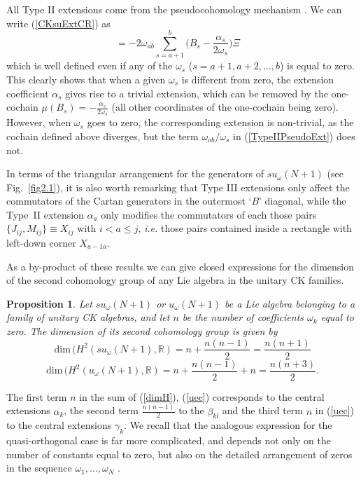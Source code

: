 \documentclass[12pt]{article}
\newtheorem{proposition}{Proposition}[section]}
\begin{document}
All Type II extensions come from the pseudocohomology mechanism
\cite{Ald.Azc:85b,Azc.Izq:95}. We can write (\ref{CKsuExtCR}) as
\begin{equation}
[{J}_{ab},{M}_{ab}]=-2{\omega}_{ab} \sum_{s=a+1}^b \big(  {B}_s -
\frac{{\alpha}_{s}}{2 {\omega}_s} \big) \Xi \quad
\label{TypeIIPseudoExt}
\end{equation}
which is well defined even if any of the ${\omega}_s$
($s=a+1, a+2, \dots, b$) is equal to zero.
This clearly shows that when a given
${\omega}_s$  is different from zero, the extension
coefficient
${\alpha}_{s}$ gives rise to a trivial extension, which can be
removed by the one-cochain
$\mu(B_s)=-\frac{{\alpha}_s}{2 {\omega}_s}$ (all other coordinates of the
one-cochain being zero). However, when ${\omega}_s$ goes to zero, the
corresponding extension is non-trivial, as the cochain  defined above
diverges, but the term ${\omega}_{ab}/{\omega}_s$
in (\ref{TypeIIPseudoExt}) does not.

In terms of the triangular arrangement for the generators of
${su}_{\omega}(N+1)$ (see Fig.~\ref{fig2.1}), it is also  worth remarking
that   Type III extensions only affect the commutators of the Cartan
generators in the outermost `$B$' diagonal, while the Type~II extension
${\alpha}_a$  only modifies the commutators of each those pairs
$\{{J}_{ij},{M}_{ij}\}\equiv{X}_{ij}$ with $i<a \leq j$, {\it i.e.} those pairs
contained inside a rectangle
with left-down corner ${X}_{a-1 a}$.

As a by-product of these results we can give closed expressions for
the dimension of the second cohomology group of any Lie algebra in
the unitary CK families.

\begin{proposition}
\label{prop4.1}
Let ${su}_{\omega}(N+1)$ or ${u}_{\omega}(N+1)$
be a Lie algebra belonging
to a family of unitary CK algebras, and let $n$ be the
number of coefficients ${\omega}_k$ equal to zero. The dimension of
its second cohomology group is given by
\begin{equation}
{\mbox{dim}}\,
(H^2({su}_{\omega}(N+1),{{\mathbb R}})=n + \frac {n(n-1)}{2} =
  \frac{n(n+1)}2
\label{dimH}
\end{equation}
\begin{equation}
{\mbox{dim}}\,
(H^2({u}_{\omega}(N+1),{{\mathbb R}})=n + \frac {n(n-1)}{2} +n =
  \frac {n(n+3)}2.
\label{uec}
\end{equation}
\end{proposition}

The first term $n$ in the sum of (\ref{dimH}), (\ref{uec}) corresponds to the
central extensions ${{\alpha}_{k}}$, the second term $\frac
{n(n-1)}{2}$ to the ${\beta}_{kl}$ and the third term $n$ in (\ref{uec})
to the central extensions ${\gamma}_k$. We recall that the analogous
expression for the quasi-orthogonal case is far more complicated,
and depends not only on the number of constants equal to zero, but
also on the detailed arrangement of zeros in the sequence ${\omega}_1,
\dots, {\omega}_N$ \cite{Azc.Her.Bue.San:96}.
\end{document}
